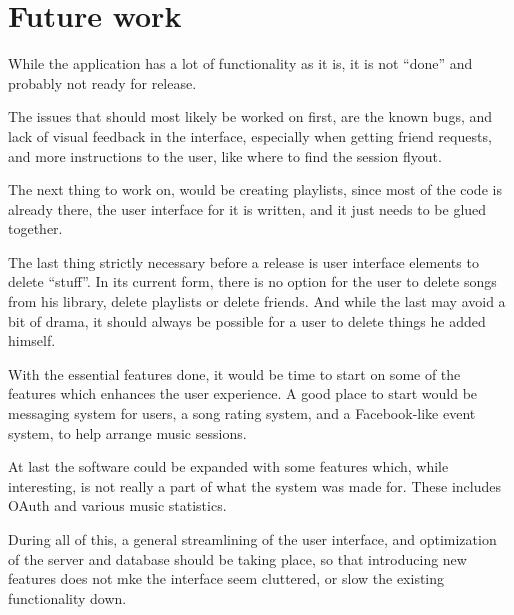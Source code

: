\section{Future work}
While the application has a lot of functionality as it is, it is not ``done'' and probably not ready
for release.

The issues that should most likely be worked on first, are the known bugs, and lack of visual feedback
in the interface, especially when getting friend requests, and more instructions to the user, like
where to find the session flyout.

The next thing to work on, would be creating playlists, since most of the code is already there, the
user interface for it is written, and it just needs to be glued together.

The last thing strictly necessary before a release is user interface elements to delete ``stuff''.
In its current form, there is no option for the user to delete songs from his library, delete playlists
or delete friends. And while the last may avoid a bit of drama, it should always be possible for
a user to delete things he added himself.

With the essential features done, it would be time to start on some of the features which enhances
the user experience. A good place to start would be messaging system for users, a song rating
system, and a Facebook-like event system, to help arrange music sessions.

At last the software could be expanded with some features which, while interesting, is not really
a part of what the system was made for. These includes OAuth and various music statistics.

During all of this, a general streamlining of the user interface, and optimization of the server and
database should be taking place, so that introducing new features does not mke the interface seem
cluttered, or slow the existing functionality down.

